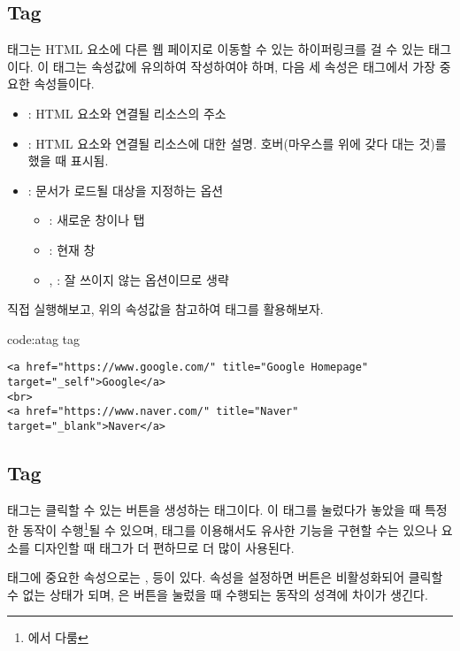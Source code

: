 \subsection*{ Tag}
 태그는 HTML 요소에 다른 웹 페이지로 이동할 수 있는 하이퍼링크를 걸 수 있는 태그이다. 이 태그는 속성값에 유의하여 작성하여야 하며, 다음 세 속성은  태그에서 가장 중요한 속성들이다.

\begin{itemize}
    \item {}: HTML 요소와 연결될 리소스의 주소
    \item {}: HTML 요소와 연결될 리소스에 대한 설명. 호버(마우스를 위에 갖다 대는 것)를 했을 때 표시됨.
    \item {}: 문서가 로드될 대상을 지정하는 옵션
    \begin{itemize}
        \item {}: 새로운 창이나 탭
        \item {}: 현재 창
        \item {}, : 잘 쓰이지 않는 옵션이므로 생략
    \end{itemize}
\end{itemize}

\를 직접 실행해보고, 위의 속성값을 참고하여  태그를 활용해보자.

\begin{codeenv}{code:atag}{ tag}\begin{verbatim}
<a href="https://www.google.com/" title="Google Homepage" target="_self">Google</a>
<br>
<a href="https://www.naver.com/" title="Naver" target="_blank">Naver</a>
\end{verbatim}
\end{codeenv}

\subsection*{ Tag}
 태그는 클릭할 수 있는 버튼을 생성하는 태그이다. 이 태그를 눌렀다가 놓았을 때 특정한 동작이 수행\footnote{에서 다룸}될 수 있으며,  태그를 이용해서도 유사한 기능을 구현할 수는 있으나 요소를 디자인할 때  태그가 더 편하므로 더 많이 사용된다.

 태그에 중요한 속성으로는 ,  등이 있다.  속성을 설정하면 버튼은 비활성화되어 클릭할 수 없는 상태가 되며, 은 버튼을 눌렀을 때 수행되는 동작의 성격에 차이가 생긴다.

